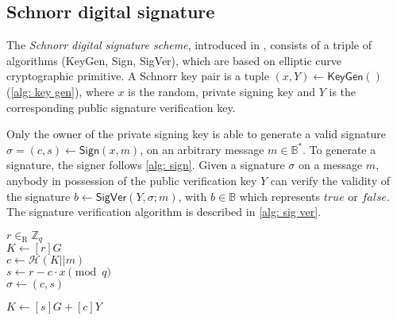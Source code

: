 \subsection{Schnorr digital signature}
The \textit{Schnorr digital signature scheme}, introduced in \cite{Schnorr90}, consists of a triple of algorithms (\textsf{KeyGen}, \textsf{Sign}, \textsf{SigVer}), which are based on elliptic curve cryptographic primitive. A Schnorr key pair is a tuple $(x, Y) \gets \mathsf{KeyGen}()$ (\cref{alg: key gen}), where $x$ is the random, private signing key and $Y$ is the corresponding public signature verification key.

Only the owner of the private signing key is able to generate a valid signature $\sigma = (c, s) \gets \mathsf{Sign} (x, m)$, on an arbitrary message $m \in \mathbb{B}^*$. To generate a signature, the signer follows \cref{alg: sign}. Given a signature $\sigma$ on a message $m$, anybody in possession of the public verification key $Y$ can verify the validity of the signature $b \gets \mathsf{SigVer} (Y, \sigma; m)$, with $b \in \mathbb{B}$ which represents $true$ or $false$. The signature verification algorithm is described in \cref{alg: sig ver}.

\begin{algorithm}[ht]
    \DontPrintSemicolon
    \caption{$\mathsf{Sign} (x, m)$}
    \label{alg: sign}
    
    $r \in_\mathrm{R} \mathbb{Z}_q$ \\
    $K \gets [r]G$ \\
    $c \gets \mathcal{H}(K || m)$ \\
    $s \gets r - c \cdot x \pmod q$ \\
    $\sigma \gets (c, s)$ \\
    \Return{$\sigma$} 
\end{algorithm}

\begin{algorithm}[H]
    \DontPrintSemicolon
    \caption{$\mathsf{SigVer} (Y, \sigma; m)$}
    \label{alg: sig ver}
    
    $K \gets [s]G + [c]Y$ \\
     
\end{algorithm}
